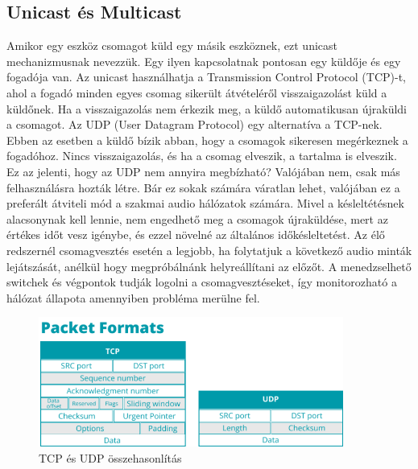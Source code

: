 \subsection{Unicast és Multicast} %
Amikor egy eszköz csomagot küld egy másik eszköznek, ezt unicast mechanizmusnak
nevezzük. Egy ilyen kapcsolatnak pontosan egy küldője és egy fogadója van. Az
unicast használhatja a Transmission Control Protocol (TCP)-t, ahol a fogadó
minden egyes csomag sikerült átvételéről visszaigazolást küld a küldőnek. Ha a
visszaigazolás nem érkezik meg, a küldő automatikusan újraküldi a csomagot. 
Az UDP (User Datagram Protocol) egy alternatíva a TCP-nek. Ebben az esetben a küldő
bízik abban, hogy a csomagok sikeresen megérkeznek a fogadóhoz. Nincs
visszaigazolás, és ha a csomag elveszik, a tartalma is elveszik.
Ez az jelenti, hogy az UDP nem annyira megbízható? Valójában nem,
csak más felhasználásra hozták létre. 
Bár ez sokak számára váratlan lehet, valójában ez a preferált átviteli mód a szakmai audio hálózatok
számára. Mivel a késleltétésnek alacsonynak kell lennie, nem engedhető meg a
csomagok újraküldése, mert az értékes időt vesz igénybe, és ezzel növelné az általános
időkésleltetést. Az élő redszernél csomagvesztés esetén a legjobb, ha folytatjuk a
következő audio minták lejátszását, anélkül hogy megpróbálnánk helyreállítani az
előzőt. A menedzselhető switchek és végpontok tudják logolni a csomagvesztéseket, így
monitorozható a hálózat állapota amennyiben probléma merülne fel.
\begin{figure}[H]
	\centering
	\includegraphics[width=100mm, keepaspectratio]{figures/tcp_udp.png}
	\caption{TCP és UDP összehasonlítás~\cite{TCPUDPPICS}}
	\label {fig:tcp_udp}
\end{figure}
